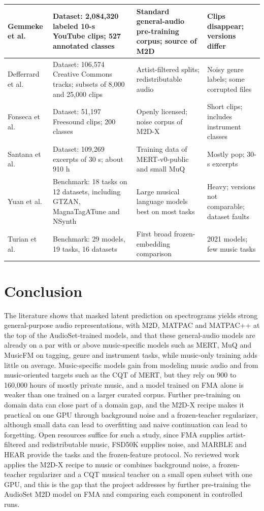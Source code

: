 \documentclass{FastFyp}
\begin{document}
{\begin{longtable}{|P{2.5cm}|P{4.1cm}|P{4.2cm}|P{3.3cm}|}
Gemmeke et al.~\cite{ref:Gemmeke:2017audioset} & Dataset: 2,084,320 labeled 10-s YouTube clips; 527 annotated classes & Standard general-audio pre-training corpus; source of M2D & Clips disappear; versions differ\\ \hline
Defferrard et al.~\cite{ref:Defferrard:2017fma} & Dataset: 106,574 Creative Commons tracks; subsets of 8,000 and 25,000 clips & Artist-filtered splits; redistributable audio & Noisy genre labels; some corrupted files\\ \hline
Fonseca et al.~\cite{ref:Fonseca:2022fsd50k} & Dataset: 51,197 Freesound clips; 200 classes & Openly licensed; noise corpus of M2D-X & Short clips; includes instrument classes\\ \hline
Santana et al.~\cite{ref:Santana:2020music4all} & Dataset: 109,269 excerpts of 30 s; about 910 h & Training data of MERT-v0-public and small MuQ & Mostly pop; 30-s excerpts\\ \hline
Yuan et al.~\cite{ref:Yuan:2023marble} & Benchmark: 18 tasks on 12 datasets, including GTZAN, MagnaTagATune and NSynth & Large musical language models best on most tasks & Heavy; versions not comparable; dataset faults\\ \hline
Turian et al.~\cite{ref:Turian:2022hear} & Benchmark: 29 models, 19 tasks, 16 datasets & First broad frozen-embedding comparison & 2021 models; few music tasks\\ \hline
\end{longtable}}

\FloatBarrier
\section{Conclusion}
\label{sec:lr-conclusion}
The literature shows that masked latent prediction on spectrograms yields strong general-purpose audio representations, with M2D, MATPAC and MATPAC++ at the top of the AudioSet-trained models, and that these general-audio models are already on a par with or above music-specific models such as MERT, MuQ and MusicFM on tagging, genre and instrument tasks, while music-only training adds little on average. Music-specific models gain from modeling music audio and from music-oriented targets such as the CQT of MERT, but they rely on 900 to 160,000 hours of mostly private music, and a model trained on FMA alone is weaker than one trained on a larger curated corpus. Further pre-training on domain data can close part of a domain gap, and the M2D-X recipe makes it practical on one GPU through background noise and a frozen-teacher regularizer, although small data can lead to overfitting and naive continuation can lead to forgetting. Open resources suffice for such a study, since FMA supplies artist-filtered and redistributable music, FSD50K supplies noise, and MARBLE and HEAR provide the tasks and the frozen-feature protocol. No reviewed work applies the M2D-X recipe to music or combines background noise, a frozen-teacher regularizer and a CQT musical teacher on a small open subset with one GPU, and this is the gap that the project addresses by further pre-training the AudioSet M2D model on FMA and comparing each component in controlled runs.
\end{document}
